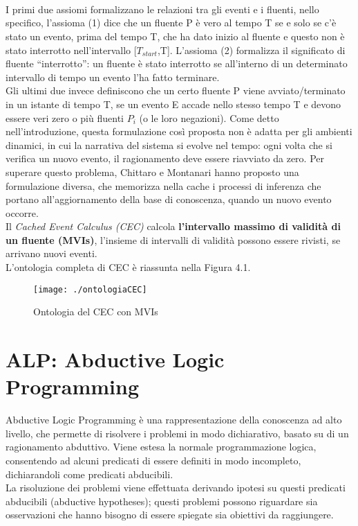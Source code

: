 \documentclass[a4paper,12pt]{report}
\newcommand{\virgolette}[1]{``#1''}
\begin{document}
    \scalebox{0.9}{(4) $terminates(E,P,T) \leftarrow happens\_at(E,T)$}\\\scalebox{0.9}{$\ \ \ \ \ \ \ \ \ \ \ \ \ \ \ \ \ \ \ \ \ \ \ \ \ \ \ \ \ \ \ \ \ \ \ \ \ \ \ \wedge [\neg{}]holds\_at(P_1,T)\wedge \dots \wedge [\neg{}]holds\_at(P_N,T)$.}\\
\\
I primi due assiomi formalizzano le relazioni tra gli eventi e i fluenti, nello specifico, l'assioma (1) dice che un fluente P è vero al tempo T se e solo se c'è stato un evento, prima del tempo T, che ha dato inizio al fluente e questo non è stato interrotto nell'intervallo [$T_{start}$,T]. L'assioma (2) formalizza il significato di fluente \virgolette{interrotto}: un fluente è stato interrotto se all'interno di un determinato intervallo di tempo un evento l'ha fatto terminare.
\\Gli ultimi due invece definiscono che un certo fluente P viene avviato/terminato in un istante di tempo T, se un evento E accade nello stesso tempo T e devono essere veri zero o più fluenti $P_i$ (o le loro negazioni).
\newpage
Come detto nell'introduzione, questa formulazione così proposta non è adatta per gli ambienti dinamici, in cui la narrativa del sistema si evolve nel tempo: ogni volta che si verifica un nuovo evento, il ragionamento deve essere riavviato da zero. Per superare questo problema, Chittaro e Montanari hanno proposto una formulazione diversa, che memorizza nella cache i processi di inferenza che portano all'aggiornamento della base di conoscenza, quando un nuovo evento occorre.\\
Il \textit{Cached Event Calculus (CEC)} calcola \textbf{l'intervallo massimo di validità di un fluente (MVIs)}, l'insieme di intervalli di validità possono essere rivisti, se arrivano nuovi eventi.
\\L'ontologia completa di CEC è riassunta nella Figura 4.1.
\begin{figure}[h]
    \begin{center}
        \texttt{[image: ./ontologiaCEC]}
        \caption{Ontologia del CEC con MVIs}
        \label{CEC}
    \end{center}
\end{figure}
\section{ALP: Abductive Logic Programming}
Abductive Logic Programming è una rappresentazione della conoscenza ad alto livello, che permette di risolvere i problemi in modo dichiarativo, basato su di un ragionamento abduttivo. Viene estesa la normale programmazione logica, consentendo ad alcuni predicati di essere definiti in modo incompleto, dichiarandoli come predicati abducibili.\\
La risoluzione dei problemi viene effettuata derivando ipotesi su questi predicati abducibili (abductive hypotheses); questi problemi possono riguardare sia osservazioni che hanno bisogno di essere spiegate sia obiettivi da raggiungere.
\newpage
\end{document}
